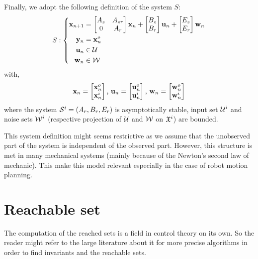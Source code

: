 Finally, we adopt the following definition of the system $S$:
\begin{equation} \label{lin_sys_decoupled}
S:
\left\{
\begin{aligned}
 \mathbf{x}_{n+1} &= 
\begin{bmatrix} A_z & A_{zr}\\ 0 & A_r \end{bmatrix}  \mathbf{x}_n
+\begin{bmatrix} B_z \\ B_r \end{bmatrix}  \mathbf{u}_n
+\begin{bmatrix} E_z\\ E_r \end{bmatrix}  \mathbf{w}_n\\
 \mathbf{y}_n &=  \mathbf{x}^o_n \\
 \mathbf{u}_n &\in \mathcal{U} \\
 \mathbf{w}_n &\in \mathcal{W} \\
\end{aligned}
\right.
\end{equation}
with,
\begin{align*}
 \mathbf{x}_n = \begin{bmatrix}
 \mathbf{x}^o_n\\
 \mathbf{x}^i_n
\end{bmatrix}
\textrm{, }
 \mathbf{u}_n = \begin{bmatrix}
 \mathbf{u}^o_n\\
 \mathbf{u}^i_n
\end{bmatrix}
\textrm{, }
 \mathbf{w}_n = \begin{bmatrix}
 \mathbf{w}^o_n\\
 \mathbf{w}^i_n
\end{bmatrix}
\end{align*}
where the system $\mathcal{S}^i=(A_r,B_r,E_r)$ is asymptotically stable, input set ${\mathcal{U}^i}$ and noise sets ${\mathcal{W}^i}$ (respective projection of $\mathcal{U}$ and $\mathcal{W}$ on $\mathfrak{X}^i$) are bounded.

This system definition might seems restrictive as we assume that the unobserved part of the system is independent of the observed part.
However, this structure is met in many mechanical systems (mainly because of the Newton's second law of mechanic).
This make this model relevant especially in the case of robot motion planning.

\section{Reachable set}
The computation of the reached sets is a field in control theory on its own.
So the reader might refer to the large literature about it for more precise algorithms in order to find invariants and the reachable sets.

